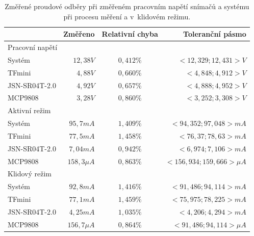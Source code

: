             \begin{table}[h]\centering
                \begin{tabular}{@{}lrcr@{}}
                    \toprule
                        & \textbf{Změřeno}    & \textbf{Relativní chyba}      & \textbf{Toleranční pásmo}\\
                    \midrule
                    \multicolumn{4}{l}{Pracovní napětí}\\
                    Systém          &  $12,38\unit{V}$      & $0,412\unit{\%}$ & $<12,329; 12,431>\unit{V}$\\
                    TFmini          &  $4,88\unit{V}$       & $0,660\unit{\%}$ & $<4,848; 4,912>\unit{V}$\\
                    JSN-SR04T-2.0   &  $4,92\unit{V}$       & $0,657\unit{\%}$ & $<4,888; 4,952>\unit{V}$\\
                    MCP9808         &  $3,28\unit{V}$       & $0,860\unit{\%}$ & $<3,252; 3,308>\unit{V}$\\
                    \multicolumn{4}{l}{Aktivní režim}\\
                    Systém          &  $95,7\unit{mA}$      & $1,409\unit{\%}$ & $<94,352; 97,048>\unit{mA}$\\
                    TFmini          &  $77,5\unit{mA}$      & $1,458\unit{\%}$ & $<76,37; 78,63>\unit{mA}$\\
                    JSN-SR04T-2.0   &  $7,04\unit{mA}$      & $0,942\unit{\%}$ & $<6,974; 7,106>\unit{mA}$\\
                    MCP9808         &  $158,3\unit{\mu A}$  & $0,863\unit{\%}$ & $<156,934; 159,666>\unit{\mu A}$\\
                    \multicolumn{4}{l}{Klidový režim}\\
                    Systém          &  $92,8\unit{mA}$      & $1,416\unit{\%}$ & $<91,486; 94,114>\unit{mA}$\\
                    TFmini          &  $77,1\unit{mA}$      & $1,459\unit{\%}$ & $<75,975; 78,225>\unit{mA}$\\
                    JSN-SR04T-2.0   &  $4,25\unit{mA}$      & $1,035\unit{\%}$ & $<4,206; 4,294>\unit{mA}$\\
                    MCP9808         &  $156,7\unit{\mu A}$  & $0,864\unit{\%}$ & $<91,486; 94,114>\unit{\mu A}$\\
                    \bottomrule
                \end{tabular}
                \caption{Změřené proudové odběry při změřeném pracovním napětí snímačů a systému při procesu měření a v~klidovém režimu.}
                \label{table:consumption}
            \end{table}

